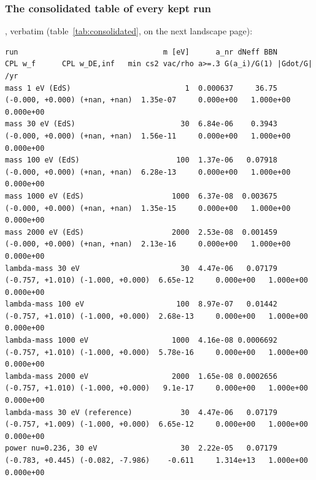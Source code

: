 \subsubsection{The consolidated table of every kept run}
\label{sec:4.7.13}

,
verbatim (table~\ref{tab:consolidated}, on the next landscape page):

\begin{landscape}
\begin{center}
\label{tab:consolidated}
\end{center}
\begin{Verbatim}[fontsize=\scriptsize,xleftmargin=0pt]
run                                 m [eV]      a_nr dNeff BBN           CPL w_f      CPL w_DE,inf   min cs2 vac/rho a>=.3 G(a_i)/G(1) |Gdot/G| /yr
mass 1 eV (EdS)                          1  0.000637     36.75 (-0.000, +0.000) (+nan, +nan)  1.35e-07     0.000e+00   1.000e+00    0.000e+00
mass 30 eV (EdS)                        30  6.84e-06    0.3943 (-0.000, +0.000) (+nan, +nan)  1.56e-11     0.000e+00   1.000e+00    0.000e+00
mass 100 eV (EdS)                      100  1.37e-06   0.07918 (-0.000, +0.000) (+nan, +nan)  6.28e-13     0.000e+00   1.000e+00    0.000e+00
mass 1000 eV (EdS)                    1000  6.37e-08  0.003675 (-0.000, +0.000) (+nan, +nan)  1.35e-15     0.000e+00   1.000e+00    0.000e+00
mass 2000 eV (EdS)                    2000  2.53e-08  0.001459 (-0.000, +0.000) (+nan, +nan)  2.13e-16     0.000e+00   1.000e+00    0.000e+00
lambda-mass 30 eV                       30  4.47e-06   0.07179 (-0.757, +1.010) (-1.000, +0.000)  6.65e-12     0.000e+00   1.000e+00    0.000e+00
lambda-mass 100 eV                     100  8.97e-07   0.01442 (-0.757, +1.010) (-1.000, +0.000)  2.68e-13     0.000e+00   1.000e+00    0.000e+00
lambda-mass 1000 eV                   1000  4.16e-08 0.0006692 (-0.757, +1.010) (-1.000, +0.000)  5.78e-16     0.000e+00   1.000e+00    0.000e+00
lambda-mass 2000 eV                   2000  1.65e-08 0.0002656 (-0.757, +1.010) (-1.000, +0.000)   9.1e-17     0.000e+00   1.000e+00    0.000e+00
lambda-mass 30 eV (reference)           30  4.47e-06   0.07179 (-0.757, +1.009) (-1.000, +0.000)  6.65e-12     0.000e+00   1.000e+00    0.000e+00
power nu=0.236, 30 eV                   30  2.22e-05   0.07179 (-0.783, +0.445) (-0.082, -7.986)    -0.611     1.314e+13   1.000e+00    0.000e+00

\end{Verbatim}
\end{landscape}
